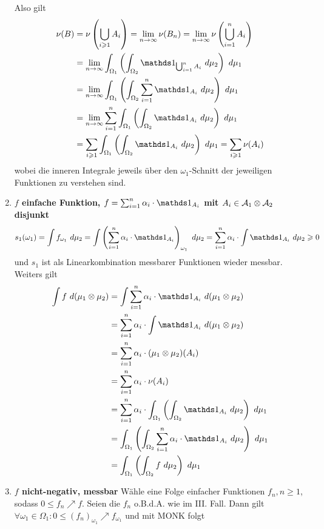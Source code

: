 \documentclass[11pt]{report}
\begin{document}
\begin{enumerate}[label=\Roman*.]
    Also gilt
    \begin{align*}
        \nu(B)&=\nu\left(\bigcup_{i\geq1}A_i\right)=\lim_{n\to\infty}\nu(B_n)=\lim_{n\to\infty}\nu\left(\bigcup_{i=1}^nA_i\right)\\
        &=\lim_{n\to\infty}\int_{\Omega_1}\left(\int_{\Omega_2}\ind{\bigcup_{i=1}^nA_i}\ d\mu_2\right)\ d\mu_1\\
        &=\lim_{n\to\infty}\int_{\Omega_1}\left(\int_{\Omega_2}\sum_{i=1}^n\ind{A_i}\ d\mu_2\right)\ d\mu_1\\
        &=\lim_{n\to\infty}\sum_{i=1}^n\int_{\Omega_1}\left(\int_{\Omega_2}\ind{A_i}\ d\mu_2\right)\ d\mu_1\\
        &=\sum_{i\geq1}\int_{\Omega_1}\left(\int_{\Omega_2}\ind{A_i}\ d\mu_2\right)\ d\mu_1=\sum_{i\geq1}\nu(A_i)
    \end{align*}
    wobei die inneren Integrale jeweils \"uber den $\omega_1$-Schnitt der jeweiligen Funktionen zu verstehen sind.
    \item \textbf{$f$ einfache Funktion, $f=\sum_{i=1}^n\alpha_i\cdot\ind{A_i}$ mit $A_i\in\mathcal{A}_1\otimes\mathcal{A}_2$ disjunkt}\newline
    $$s_1(\omega_1)=\int f_{\omega_1}\ d\mu_2=\int\left(\sum_{i=1}^n\alpha_i\cdot\ind{A_i}\right)_{\omega_1}\ d\mu_2=\sum_{i=1}^n\alpha_i\cdot\int\ind{A_i}\ d\mu_2\geq0$$
    und $s_1$ ist als Linearkombination messbarer Funktionen wieder messbar. Weiters gilt
    \begin{align*}
        \int f \ d(\mu_1\otimes\mu_2)&=\int\sum_{i=1}^n\alpha_i\cdot\ind{A_i}\ d(\mu_1\otimes\mu_2)\\
        &=\sum_{i=1}^n\alpha_i\cdot\int\ind{A_i}\ d(\mu_1\otimes\mu_2)\\
        &=\sum_{i=1}^n\alpha_i\cdot(\mu_1\otimes\mu_2)(A_i)\\
        &=\sum_{i=1}^n\alpha_i\cdot\nu(A_i)\\
        &=\sum_{i=1}^n\alpha_i\cdot\int_{\Omega_1}\left(\int_{\Omega_2}\ind{A_i}\ d\mu_2\right)\ d\mu_1\\
    &=\int_{\Omega_1}\left(\int_{\Omega_2}\sum_{i=1}^n\alpha_i\cdot\ind{A_i}\ d\mu_2\right)\ d\mu_1\\
        &=\int_{\Omega_1}\left(\int_{\Omega_2}f\ d\mu_2\right)\ d\mu_1
    \end{align*}
    \item \textbf{$f$ nicht-negativ, messbar}\newline
    W\"ahle eine Folge einfacher Funktionen $f_n,n\geq1$, sodass $0\leq f_n\nearrow f$. Seien die $f_n$ o.B.d.A. wie im III. Fall. Dann gilt $\forall\omega_1\in\Omega_1:0\leq(f_n)_{\omega_1}\nearrow f_{\omega_1}$ und mit MONK folgt

\end{enumerate}
\end{document}
